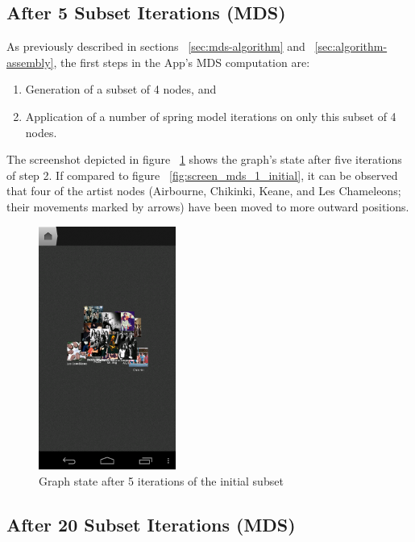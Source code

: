 \newpage
\subsection{After 5 Subset Iterations (MDS)}
\label{subsec:mds-after-five-subset-iterations}

As previously described in sections ~\ref{sec:mds-algorithm} and ~\ref{sec:algorithm-assembly}, the first steps in the App's MDS computation are:

\begin{enumerate}
	\item Generation of a subset of 4 nodes, and
	\item Application of a number of spring model iterations on only this subset of 4 nodes.
\end{enumerate}

The screenshot depicted in figure ~\ref{fig:screen_mds_2_after_5_subset_iterations} shows the graph's state after five iterations of step 2. If compared to figure ~\ref{fig:screen_mds_1_initial}, it can be observed that four of the artist nodes (Airbourne, Chikinki, Keane, and Les Chameleons; their movements marked by arrows) have been moved to more outward positions.

\begin{figure}[H]
  \centering
    \includegraphics[width=0.4\textwidth]{figures/screen_mds_2_after_5_subset_iterations}
  \caption{Graph state after 5 iterations of the initial subset}
  \label{fig:screen_mds_2_after_5_subset_iterations}
\end{figure}

\newpage
\subsection{After 20 Subset Iterations (MDS)}

